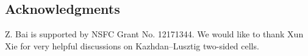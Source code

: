 \documentclass[11pt, reqno]{amsart}
\theoremstyle{definition}
\numberwithin{equation}{section}
\begin{document}
\subsection*{Acknowledgments}

Z. Bai is
supported by NSFC Grant No. 12171344. 
We would like to thank Xun Xie for very helpful
discussions on Kazhdan--Lusztig two-sided cells.






%
%

\end{document}
